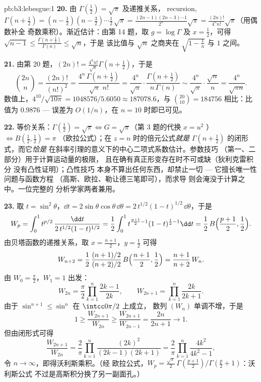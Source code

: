 \begin{solution}{pb:b3:lebesgue:1}
\textbf{20.} 由 $\Gamma(\frac12) = \sqrt\pi$ 及递推关系，
recursion, $\Gamma(n + \frac12) = (n - \frac12)(n -
\frac32)\cdots\frac12\,\sqrt\pi =
\frac{(2n-1)(2n-3)\cdots1}{2^n}\sqrt\pi =
\frac{(2n)!}{4^nn!}\sqrt\pi$（用偶数补全
奇数乘积）。渐近估计：由第 14 题，取 $g = \log\Gamma$
及 $x = \frac12$，可得 $\sqrt{n-1} \leq
\frac{\Gamma(n+\frac12)}{\Gamma(n)} \leq \sqrt n$，于是
该比值与 $\sqrt n$ 之商夹在 $\sqrt{1 - \frac1n}$
与 $1$ 之间。

\textbf{21.} 由第 20 题，$(2n)! =
\frac{4^nn!}{\sqrt\pi}\Gamma(n + \tfrac12)$，于是
\[
\binom{2n}n = \frac{(2n)!}{(n!)^2}
= \frac{4^n\,\Gamma(n+\frac12)}{\sqrt\pi\;n!}
= \frac{4^n}{\sqrt\pi}\cdot
\frac{\Gamma(n+\frac12)}{n\,\Gamma(n)}
\sim \frac{4^n}{\sqrt\pi}\cdot\frac{\sqrt n}{n}
= \frac{4^n}{\sqrt{\pi n}} .
\]
数值上，$4^{10}/\sqrt{10\pi} = 1048576/5.6050 \approx
187078.6$，与 $\binom{20}{10} = 184756$ 相比：比值为 $0.9876$
--- 误差为 $O(1/n)$，在 $n = 10$ 时即已可见。

\textbf{22.} 等价关系：$\Gamma(\frac12) = \sqrt\pi
\Leftrightarrow G = \sqrt\pi$（第 3 题的代换 $x = u^2$
）$\Leftrightarrow B(\frac12, \frac12) = \pi$
（欧拉公式）；在 $z = n$ 时的倍元公式\emph{就是}
$\Gamma(n + \frac12)$ 的闭形式，而它\emph{恰是}
在斜率引理的意义下的中心二项式系数估计。参数技巧
（第一、二部分）用于计算运动量的极限，
且在确有真正形变存在时不可或缺（狄利克雷积分
没有凸性证明）；凸性技巧
本身不算出任何东西，却禁止一切
--- 它擅长唯一性问题与函数方程
（高斯、欧拉、勒让德三笔即可），而求导
则会淹没于计算之中。一位完整的
分析学家两者兼用。

\textbf{23.} 取 $t = \sin^2\theta$，$\dd t =
2\sin\theta\cos\theta\,\dd\theta =
2\,t^{1/2}(1-t)^{1/2}\,\dd\theta$，于是
\[
W_p = \int_0^1 t^{p/2}\,
\frac{\dd t}{2\,t^{1/2}(1-t)^{1/2}}
= \frac12\int_0^1 t^{\frac{p+1}2 - 1}(1-t)^{\frac12 - 1}\dd t
= \frac12\,B\Bigl(\frac{p+1}2, \frac12\Bigr).
\]
由贝塔函数的递推关系，取 $x = \frac{n+1}2$，$y = \frac12$
可得
\[
W_{n+2} = \frac12\,
\frac{(n+1)/2}{(n+2)/2}\,B\Bigl(\frac{n+1}2, \frac12\Bigr)
= \frac{n+1}{n+2}\,W_n .
\]
由 $W_0 = \frac\pi2$，$W_1 = 1$ 出发：
\[
W_{2n} = \frac\pi2\prod_{k=1}^n\frac{2k-1}{2k},
\qquad
W_{2n+1} = \prod_{k=1}^n\frac{2k}{2k+1} .
\]
由于 $\sin^{n+1} \leq \sin^n$ 在 $\intcc0{\pi/2}$ 上成立，
数列 $(W_n)$ 单调不增，于是
\[
1 \geq \frac{W_{2n+1}}{W_{2n}} \geq
\frac{W_{2n+1}}{W_{2n-1}} = \frac{2n}{2n+1}
\longrightarrow 1 .
\]
但由闭形式可得
\[
\frac{W_{2n+1}}{W_{2n}} = \frac2\pi
\prod_{k=1}^n\frac{(2k)^2}{(2k-1)(2k+1)}
= \frac2\pi\prod_{k=1}^n\frac{4k^2}{4k^2-1},
\]
令 $n \to \infty$，即得沃利斯乘积。（经
欧拉公式，$W_p = \frac{\sqrt\pi}2\,
\Gamma(\frac{p+1}2)/\Gamma(\frac p2 + 1)$：沃利斯公式
不过是高斯积分换了另一副面孔。）


\end{solution}
